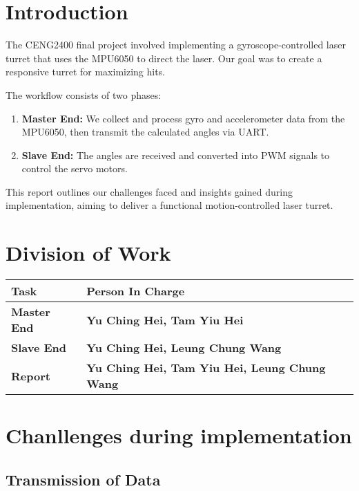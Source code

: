 \documentclass[12pt, a4paper]{article}
\begin{document}
\section{Introduction}
The CENG2400 final project involved implementing a gyroscope-controlled laser turret 
that uses the MPU6050 to direct the laser. Our goal was to create a responsive turret for maximizing hits.

\noindent The workflow consists of two phases:
\begin{enumerate}
    \item \textbf{Master End:} We collect and process gyro and accelerometer 
          data from the \\MPU6050, then transmit the calculated angles via UART.
    \item \textbf{Slave End:} The angles are received and converted into PWM 
          signals to control the servo motors.
\end{enumerate}
This report outlines our challenges faced and insights gained during implementation, aiming to deliver a functional motion-controlled laser turret.

\section{Division of Work}
\begin{tabularx}{\textwidth}{|l||X|}
    \hline
    \textbf{Task} & \textbf{Person In Charge} \\
    \hline\hline
    \textbf{Master End} & \textbf{Yu Ching Hei, Tam Yiu Hei} \\
    \hline
    \textbf{Slave End} & \textbf{Yu Ching Hei, Leung Chung Wang} \\
    \hline
    \textbf{Report} & \textbf{Yu Ching Hei, Tam Yiu Hei, Leung Chung Wang} \\
    \hline
\end{tabularx}

\section{Chanllenges during implementation}
\subsection{Transmission of Data}
\end{document}
